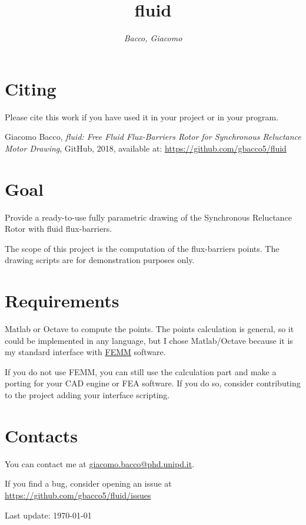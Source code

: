 \documentclass[b5paper,11pt,oneside,fleqn]{article}
\title{\raggedleft\sffamily\Huge fluid}
\author{\sffamily\itshape Bacco, Giacomo}
\date{}
\begin{document}
\maketitle


\section*{Citing}
Please cite this work if you have used it in your project or in your program.
\vspace{0\baselineskip}

{\small\noindent%
Giacomo Bacco, \emph{fluid: Free Fluid Flux-Barriers Rotor for Synchronous 
Reluctance Motor Drawing}, GitHub, 2018, available at:
\url{https://github.com/gbacco5/fluid}
}


\tableofcontents



\section*{Goal}
Provide a ready-to-use fully parametric drawing of the Synchronous Reluctance 
Rotor with fluid flux-barriers.

The scope of this project is the computation of the flux-barriers points.
The drawing scripts are for demonstration purposes only.


\section*{Requirements}
Matlab or Octave to compute the points. The points calculation is general, so 
it could be implemented in any language, but I chose Matlab/Octave because it 
is my standard interface with \href{http://www.femm.info/}{FEMM} software.

If you do not use FEMM, you can still use the calculation part and make a 
porting for your CAD engine or FEA software. If you do so, consider 
contributing to the project adding your interface scripting.

\section*{Contacts}
You can contact me at
\href{mailto:giacomo.bacco@phd.unipd.it}{giacomo.bacco@phd.unipd.it}.

If you find a bug, consider opening an issue at 
\url{https://github.com/gbacco5/fluid/issues}

\vfill
{\footnotesize\noindent  Last update: \today}
\end{document}
